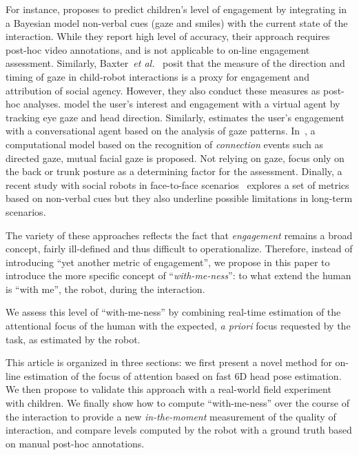 \documentclass{sig-alternate}
\newcommand{\etal}{\textit{et al.}\xspace}
\begin{document}

For instance, \cite{Castellano:2009} proposes to predict children's level of
engagement by integrating in a Bayesian model non-verbal cues (gaze and smiles)
with the current state of the interaction. While they report high level of
accuracy, their approach requires post-hoc video annotations, and is not
applicable to on-line engagement assessment. Similarly,
Baxter~\etal~\cite{baxter2014tracking} posit that the measure of the direction
and timing of gaze in child-robot interactions is a proxy for engagement and
attribution of social agency. However, they also conduct these measures as
post-hoc analyses.  \cite{peters2010investigating} model the user's interest and
engagement with a virtual agent by tracking eye gaze and head direction.
Similarly, \cite{ishii2011combining} estimates the user's engagement with a
conversational agent based on the analysis of gaze patterns.
In~\cite{Rich:2010}, a computational model based on the recognition of
\emph{connection} events such as directed gaze, mutual facial gaze is proposed. Not
relying on gaze, \cite{Sanghvi:2011} focus only on the back or trunk posture as
a determining factor for the assessment. Dinally, a recent study with
social robots in face-to-face scenarios~\cite{anzalone} explores a set of metrics based on
non-verbal cues but they also underline possible limitations in long-term
scenarios.

The variety of these approaches reflects the fact that \emph{engagement} remains
a broad concept, fairly ill-defined and thus difficult to operationalize.
Therefore, instead of introducing ``yet another metric of engagement'', we
propose in this paper to introduce the more specific concept of
``\emph{with-me-ness}'': to what extend the human is ``with me'', the
robot, during the interaction.

We assess this level of ``with-me-ness'' by combining real-time estimation of the
attentional focus of the human with the expected, {\it a priori} focus
requested by the task, as estimated by the robot.

This article is organized in three sections: we first present a novel
method for on-line estimation of the focus of attention based on fast 6D head
pose estimation. We then propose to validate this approach with 
a real-world field experiment with children. We finally show how to compute
``with-me-ness'' over the course of the interaction to provide a new \emph{in-the-moment} measurement of
the quality of interaction, and compare levels computed by the robot with a
ground truth based on manual post-hoc annotations.
\end{document}
